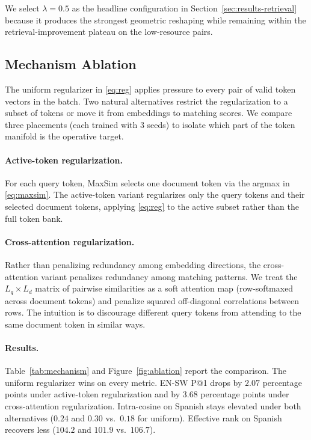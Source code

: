 We select $\lambda = 0.5$ as the headline configuration in Section~\ref{sec:results-retrieval} because it produces the strongest geometric reshaping while remaining within the retrieval-improvement plateau on the low-resource pairs.

\subsection{Mechanism Ablation}
\label{sec:ablations-mechanism}

The uniform regularizer in \eqref{eq:reg} applies pressure to every pair of valid token vectors in the batch. Two natural alternatives restrict the regularization to a subset of tokens or move it from embeddings to matching scores. We compare three placements (each trained with $3$ seeds) to isolate which part of the token manifold is the operative target.

\paragraph{Active-token regularization.} For each query token, MaxSim selects one document token via the argmax in \eqref{eq:maxsim}. The active-token variant regularizes only the query tokens and their selected document tokens, applying \eqref{eq:reg} to the active subset rather than the full token bank.

\paragraph{Cross-attention regularization.} Rather than penalizing redundancy among embedding directions, the cross-attention variant penalizes redundancy among matching patterns. We treat the $L_q \times L_d$ matrix of pairwise similarities as a soft attention map (row-softmaxed across document tokens) and penalize squared off-diagonal correlations between rows. The intuition is to discourage different query tokens from attending to the same document token in similar ways.

\paragraph{Results.} Table~\ref{tab:mechanism} and Figure~\ref{fig:ablation} report the comparison. The uniform regularizer wins on every metric. EN-SW P@1 drops by $2.07$ percentage points under active-token regularization and by $3.68$ percentage points under cross-attention regularization. Intra-cosine on Spanish stays elevated under both alternatives ($0.24$ and $0.30$ vs.\ $0.18$ for uniform). Effective rank on Spanish recovers less ($104.2$ and $101.9$ vs.\ $106.7$).

